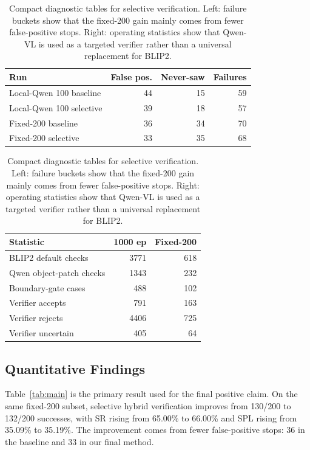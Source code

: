 \documentclass[10pt,twocolumn,letterpaper]{article}
\begin{document}
\begin{table}[t]
\centering
\footnotesize
\caption{Compact diagnostic tables for selective verification. Left: failure buckets show that the fixed-200 gain mainly comes from fewer false-positive stops. Right: operating statistics show that Qwen-VL is used as a targeted verifier rather than a universal replacement for BLIP2.}
\label{tab:diagnostics}
\begin{minipage}[t]{0.48\linewidth}
\centering
\begin{tabular}{lrrr}
\toprule
Run & False pos. & Never-saw & Failures \\
\midrule
Local-Qwen 100 baseline & 44 & 15 & 59 \\
Local-Qwen 100 selective & 39 & 18 & 57 \\
Fixed-200 baseline & 36 & 34 & 70 \\
Fixed-200 selective & 33 & 35 & 68 \\
\bottomrule
\end{tabular}
\end{minipage}
\hfill
\begin{minipage}[t]{0.48\linewidth}
\centering
\begin{tabular}{lrr}
\toprule
Statistic & 1000 ep & Fixed-200 \\
\midrule
BLIP2 default checks & 3771 & 618 \\
Qwen object-patch checks & 1343 & 232 \\
Boundary-gate cases & 488 & 102 \\
Verifier accepts & 791 & 163 \\
Verifier rejects & 4406 & 725 \\
Verifier uncertain & 405 & 64 \\
\bottomrule
\end{tabular}
\end{minipage}
\end{table}

\subsection{Quantitative Findings}
\label{sec:quantitative}
Table~\ref{tab:main} is the primary result used for the final positive claim. On the same fixed-200 subset, selective hybrid verification improves from 130/200 to 132/200 successes, with SR rising from 65.00\% to 66.00\% and SPL rising from 35.09\% to 35.19\%. The improvement comes from fewer false-positive stops: 36 in the baseline and 33 in our final method.
\end{document}
